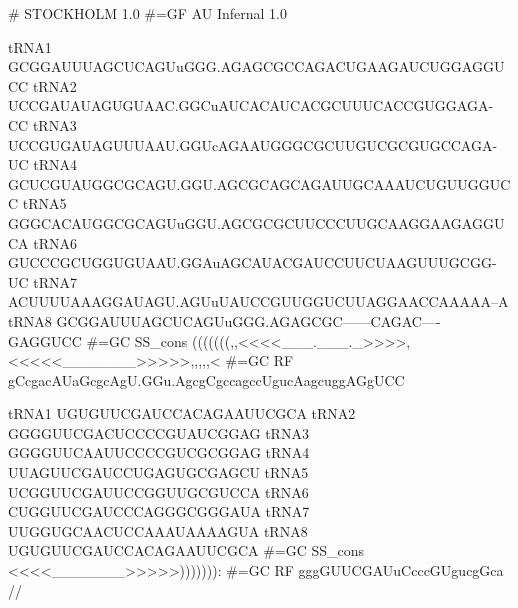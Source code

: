 \begin{sreoutput}
# STOCKHOLM 1.0
#=GF AU Infernal 1.0

tRNA1        GCGGAUUUAGCUCAGUuGGG.AGAGCGCCAGACUGAAGAUCUGGAGGUCC
tRNA2        UCCGAUAUAGUGUAAC.GGCuAUCACAUCACGCUUUCACCGUGGAGA-CC
tRNA3        UCCGUGAUAGUUUAAU.GGUcAGAAUGGGCGCUUGUCGCGUGCCAGA-UC
tRNA4        GCUCGUAUGGCGCAGU.GGU.AGCGCAGCAGAUUGCAAAUCUGUUGGUCC
tRNA5        GGGCACAUGGCGCAGUuGGU.AGCGCGCUUCCCUUGCAAGGAAGAGGUCA
tRNA6        GUCCCGCUGGUGUAAU.GGAuAGCAUACGAUCCUUCUAAGUUUGCGG-UC
tRNA7        ACUUUUAAAGGAUAGU.AGUuUAUCCGUUGGUCUUAGGAACCAAAAA--A
tRNA8        GCGGAUUUAGCUCAGUuGGG.AGAGCGC------CAGAC----GAGGUCC
#=GC SS_cons (((((((,,<<<<___.___._>>>>,<<<<<_______>>>>>,,,,,<
#=GC RF      gCcgacAUaGcgcAgU.GGu.AgcgCgccagccUgucAagcuggAGgUCC

tRNA1        UGUGUUCGAUCCACAGAAUUCGCA
tRNA2        GGGGUUCGACUCCCCGUAUCGGAG
tRNA3        GGGGUUCAAUUCCCCGUCGCGGAG
tRNA4        UUAGUUCGAUCCUGAGUGCGAGCU
tRNA5        UCGGUUCGAUUCCGGUUGCGUCCA
tRNA6        CUGGUUCGAUCCCAGGGCGGGAUA
tRNA7        UUGGUGCAACUCCAAAUAAAAGUA
tRNA8        UGUGUUCGAUCCACAGAAUUCGCA
#=GC SS_cons <<<<_______>>>>>))))))):
#=GC RF      gggGUUCGAUuCcccGUgucgGca
//
\end{sreoutput}

